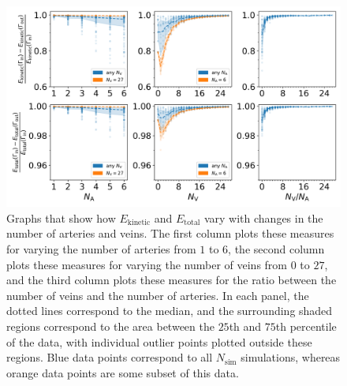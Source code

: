             \begin{figure}
                \centering
                \includegraphics[width=\textwidth]{diagrams/results-variations/mega5_no-arteries_no-veins_veins-to-arteries.png}
                \caption{Graphs that show how $E_\text{kinetic}$ and $E_\text{total}$ vary with changes in the number of arteries and veins. The first column plots these measures for varying the number of arteries from $1$ to $6$, the second column plots these measures for varying the number of veins from $0$ to $27$, and the third column plots these measures for the ratio between the number of veins and the number of arteries. In each panel, the dotted lines correspond to the median, and the surrounding shaded regions correspond to the area between the $25$th and $75$th percentile of the data, with individual outlier points plotted outside these regions. Blue data points correspond to all $N_\text{sim}$ simulations, whereas orange data points are some subset of this data.}
                \label{fig:mega-vessels5}
            \end{figure}
            

